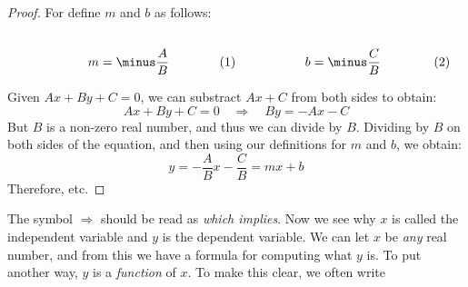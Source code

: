 \documentclass[crop=false,class=book,oneside]{standalone}                      %
\begin{document}
            \begin{proof}
                For define $m$ and $b$ as follows:
                \par
                \begin{subequations}
                    \begin{minipage}[b]{0.49\textwidth}
                        \centering
                        \begin{equation}
                            m=\minus\frac{A}{B}
                        \end{equation}
                    \end{minipage}
                    \hfill
                    \begin{minipage}[b]{0.49\textwidth}
                        \centering
                        \begin{equation}
                            b=\minus\frac{C}{B}
                        \end{equation}
                    \end{minipage}
                \end{subequations}
                \par\vspace{2.5ex}
                Given $Ax+By+C=0$, we can substract $Ax+C$ from both sides
                to obtain:
                \begin{equation}
                    Ax+By+C=0
                    \quad\Longrightarrow\quad
                    By=\minus{A}x-C
                \end{equation}
                But $B$ is a non-zero real number, and thus we can divide by
                $B$. Dividing by $B$ on both sides of the equation, and then
                using our definitions for $m$ and $b$, we obtain:
                \begin{equation}
                    y=\minus\frac{A}{B}x-\frac{C}{B}
                     =mx+b
                \end{equation}
                Therefore, etc.
            \end{proof}
            The symbol $\Longrightarrow$ should be read as
            \textit{which implies}. Now we see why $x$ is called the
            independent variable and $y$ is the dependent variable. We can let
            $x$ be \textit{any} real number, and from this we have a formula
            for computing what $y$ is. To put another way, $y$ is a
            \textit{function} of $x$. To make this clear, we often write
\end{document}
